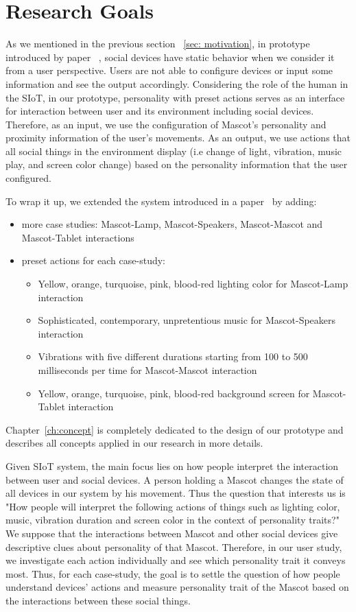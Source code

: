 \section{Research Goals}
\label{sec:research-goals}
As we mentioned in the previous section ~\ref{sec: motivation}, in prototype introduced
by paper ~\cite{okada2016autonomous}, social devices have static behavior when we consider it from a user perspective.
Users are not able to configure devices or input some information and see the output accordingly.
Considering the role of the human in the SIoT, in our prototype, personality with preset
actions serves as an interface for interaction between user and its environment including social devices.
Therefore, as an input, we use the configuration of Mascot's personality and proximity
information of the user's movements.
As an output, we use actions that all social things in the environment display
(i.e change of light, vibration, music play, and screen color change) based
on the personality information that the user configured.

To wrap it up, we extended the system introduced in a paper~\cite{okada2016autonomous} by adding:
\begin{itemize}
    \item more case studies: Mascot-Lamp, Mascot-Speakers, Mascot-Mascot and Mascot-Tablet interactions
    \item preset actions for each case-study:
    \begin{itemize}
        \item Yellow, orange, turquoise, pink, blood-red lighting color for Mascot-Lamp interaction
        \item Sophisticated, contemporary, unpretentious music for Mascot-Speakers interaction
        \item Vibrations with five different durations starting from 100 to
        500 milliseconds per time for Mascot-Mascot interaction
        \item Yellow, orange, turquoise, pink, blood-red background screen for Mascot-Tablet interaction
    \end{itemize}
\end{itemize}
Chapter~\ref{ch:concept} is completely dedicated to the design of our prototype and
describes all concepts applied in our research in more details.

Given SIoT system, the main focus lies on how people interpret the interaction between user and social devices.
A person holding a Mascot changes the state of all devices in our system by his movement.
Thus the question that interests us is "How people will interpret the following actions of things such as
lighting color, music, vibration duration and screen color in the context of personality traits?"
We suppose that the interactions between Mascot and other social
devices give descriptive clues about personality of that Mascot.
Therefore, in our user study, we investigate each action individually and see which personality trait it conveys most.
Thus, for each case-study, the goal is to settle the question of how people understand devices' actions
and measure personality trait of the Mascot based on the interactions between these social things.

